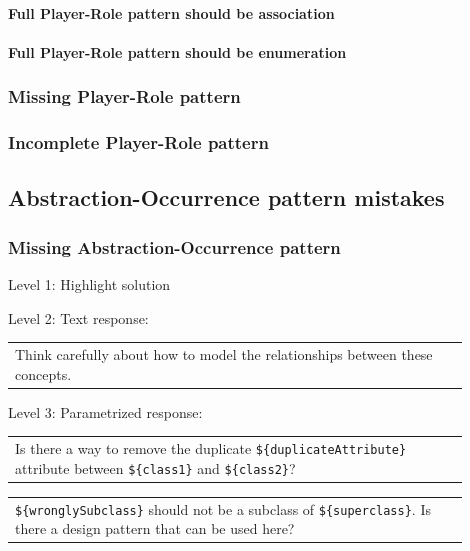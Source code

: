 \paragraph{Full Player-Role pattern should be association}


\paragraph{Full Player-Role pattern should be enumeration}


\subsubsection{Missing Player-Role pattern}


\subsubsection{Incomplete Player-Role pattern}


\subsection{Abstraction-Occurrence pattern mistakes}

\subsubsection{Missing Abstraction-Occurrence pattern}

\noindent Level 1: Highlight solution \medskip

\noindent Level 2: Text response: \medskip

\begin{tabular}{|p{0.9\linewidth}}
Think carefully about how to model the relationships between these concepts.
\end{tabular} \medskip

\noindent Level 3: Parametrized response: \medskip

\begin{tabular}{|p{0.9\linewidth}}
Is there a way to remove the duplicate \verb|${duplicateAttribute}| attribute between \verb|${class1}| and \verb|${class2}|?
\end{tabular} \medskip

\begin{tabular}{|p{0.9\linewidth}}
\verb|${wronglySubclass}| should not be a subclass of \verb|${superclass}|. Is there a design pattern that can be used here?
\end{tabular} \medskip

